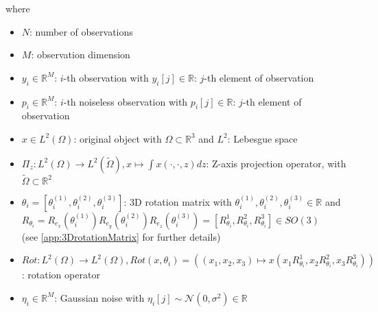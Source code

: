 where 
\begin{itemize}
    \item $N$: number of observations
    \item $M$: observation dimension
    \item $y_i \in \mathbb{R}^M$:  $i$-th observation with $y_i[j] \in \mathbb{R}$: $j$-th element of observation
    \item $p_i \in \mathbb{R}^M$:  $i$-th noiseless observation with $p_i[j] \in \mathbb{R}$: $j$-th element of observation
    \item $x \in L^2(\Omega)$: original object with $\Omega \subset \mathbb{R}^3 $ and $L^2$: Lebesgue space
    \item $\Pi_z : L^2(\Omega) \to L^2(\tilde{\Omega}), x \mapsto  \int x(\cdot,\cdot,z) dz$: Z-axis projection operator,
          with $\tilde{\Omega} \subset \mathbb{R}^2$
    \item $\theta_i = [\theta_i^{(1)}, \theta_i^{(2)}, \theta_i^{(3)} ] $: 3D rotation matrix with $ \theta_i^{(1)}, \theta_i^{(2)}, \theta_i^{(3)} \in \mathbb{R}$ and \\
          $R_{\theta_i} =  R_{e_x} (\theta_i^{(1)}) R_{e_y} (\theta_i^{(2)}) R_{e_z} (\theta_i^{(3)}) = [R^1_{\theta_i}, R^2_{\theta_i}, R^3_{\theta_i}] \in SO(3)$ \\
          (see \ref{app:3DrotationMatrix} for further details)
    \item $\textit{Rot} : L^2(\Omega) \to L^2(\Omega), \textit{Rot}(x, \theta_i) = \left((x_1,x_2,x_3) \mapsto x( x_1R^1_{\theta_i}, x_2R^2_{\theta_i}, x_3R^3_{\theta_i})\right)$: rotation operator
    \item $\eta_i \in \mathbb{R}^M$: Gaussian noise with $\eta_i[j] \sim \mathcal{N}(0,\sigma^2) \in \mathbb{R}$
\end{itemize}




